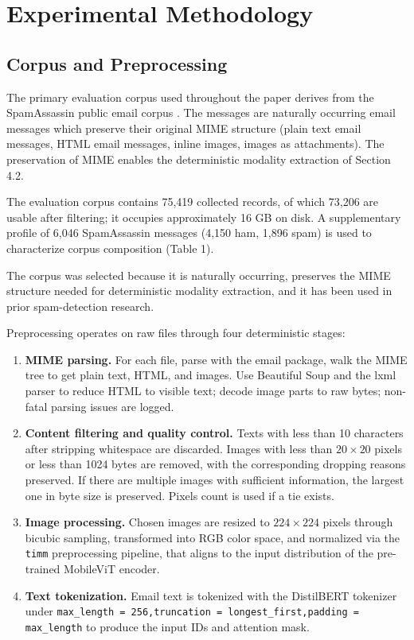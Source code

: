 \documentclass[10pt,twoside]{article}
\newcommand{\code}[1]{\texttt{#1}}
\begin{document}
\section{Experimental Methodology}\label{sec:6}

\subsection{Corpus and Preprocessing}\label{sec:6.1}\label{sec:preprocessing}

The primary evaluation corpus used throughout the paper derives from the SpamAssassin public email corpus \citep{spamassassin2006}. The messages are naturally occurring email messages which preserve their original MIME structure (plain text email messages, HTML email messages, inline images, images as attachments). The preservation of MIME enables the deterministic modality extraction of Section 4.2.

The evaluation corpus contains 75,419 collected records, of which 73,206 are usable after filtering; it occupies approximately 16 GB on disk. A supplementary profile of 6,046 SpamAssassin messages (4,150 ham, 1,896 spam) is used to characterize corpus composition (Table 1).

The corpus was selected because it is naturally occurring, preserves the MIME structure needed for deterministic modality extraction, and it has been used in prior spam-detection research.

Preprocessing operates on raw  files through four deterministic stages:

\begin{enumerate}[leftmargin=*,itemsep=1.5pt]
\item[1.] \textbf{MIME parsing.} For each  file, parse with the email package, walk the MIME tree to get plain text, HTML, and images. Use Beautiful Soup and the lxml parser to reduce HTML to visible text; decode image parts to raw bytes; non-fatal parsing issues are logged.
\item[2.] \textbf{Content filtering and quality control.} Texts with less than 10 characters after stripping whitespace are discarded. Images with less than $20 \times 20$ pixels or less than 1024 bytes are removed, with the corresponding dropping reasons preserved. If there are multiple images with sufficient information, the largest one in byte size is preserved. Pixels count is used if a tie exists.
\item[3.] \textbf{Image processing.} Chosen images are resized to $224 \times 224$ pixels through bicubic sampling, transformed into RGB color space, and normalized via the \code{timm} \citep{wightman2019timm} preprocessing pipeline, that aligns to the input distribution of the pre-trained MobileViT encoder.
\item[4.] \textbf{Text tokenization.} Email text is tokenized with the DistilBERT tokenizer under \code{max\_length = 256,\allowbreak truncation = longest\_first,\allowbreak padding = max\_length} to produce the input IDs and attention mask.
\end{enumerate}
\end{document}
